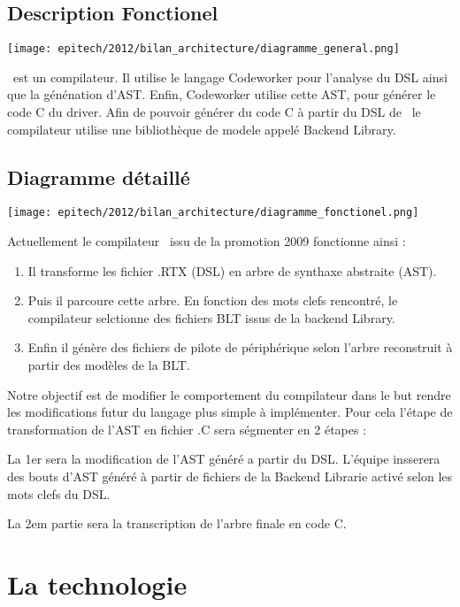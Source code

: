 \documentclass{rtxreport}
\begin{document}
\section{Description Fonctionel}

\texttt{[image: epitech/2012/bilan\_architecture/diagramme\_general.png]}

\rtx\ est un compilateur.
Il utilise le langage Codeworker pour l'analyse du DSL ainsi que la génénation d'AST. 
Enfin, Codeworker utilise cette AST, pour générer le code C du driver.
Afin de pouvoir générer du code C à partir du DSL de \rtx\, 
le compilateur utilise une bibliothèque de modele appelé Backend Library.


\section{Diagramme détaillé}

\texttt{[image: epitech/2012/bilan\_architecture/diagramme\_fonctionel.png]}

Actuellement le compilateur \rtx\ issu de la promotion 2009 fonctionne ainsi :

\begin{enumerate}
\item Il transforme les fichier .RTX (DSL) en arbre de synthaxe abstraite (AST).
\item Puis il parcoure cette arbre. En fonction des mots clefs rencontré, 
le compilateur selctionne des fichiers BLT issus de la backend Library.
\item Enfin il génère des fichiers de pilote de périphérique selon l'arbre reconstruit 
à partir des modèles de la BLT.
\end{enumerate}

Notre objectif est de modifier le comportement du compilateur dans le but 
rendre les modifications futur du langage plus simple à implémenter.
Pour cela l'étape de transformation de l'AST en fichier .C sera ségmenter en 2 étapes :

La 1er sera la modification de l'AST généré a partir du DSL. L'équipe insserera des
bouts d'AST généré à partir de fichiers de la Backend Librarie activé selon 
les mots clefs du DSL.

La 2em partie sera la transcription de l'arbre finale en code C.


\chapter{La technologie \rtx\ }
\end{document}
